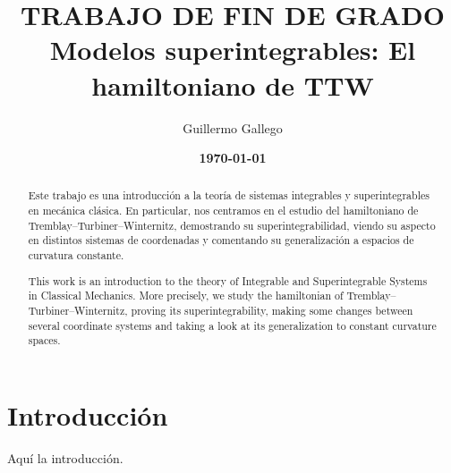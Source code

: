\documentclass[12pt,a4paper,twoside]{article}
\title{\sf TRABAJO DE FIN DE GRADO \\  Modelos superintegrables: El hamiltoniano de TTW}
\author{\sf Guillermo Gallego}
\date{\bf \today}
\theoremstyle{definition} \newtheorem{defn}[thm]{Definición}
\theoremstyle{definition} \newtheorem{ejemplo}[thm]{Ejemplo}
\theoremstyle{definition} \newtheorem{ejercicio}[thm]{Ejercicio}
\theoremstyle{remark} \newtheorem*{obs}{Observación}
\begin{document}
\maketitle
\begin{abstract}
  Este trabajo es una introducción a la teoría de sistemas integrables y superintegrables en mecánica clásica. En particular, nos centramos en el estudio del hamiltoniano de Tremblay--Turbiner--Winternitz, demostrando su superintegrabilidad, viendo su aspecto en distintos sistemas de coordenadas y comentando su generalización a espacios de curvatura constante.
\end{abstract}
\begin{abstract}
 This work is an introduction to the theory of Integrable and Superintegrable Systems in Classical Mechanics. More precisely, we study the hamiltonian of Tremblay--Turbiner--Winternitz, proving its superintegrability, making some changes between several coordinate systems and taking a look at its generalization to constant curvature spaces.
\end{abstract}
\newpage

\tableofcontents

\section*{Introducción}
Aquí la introducción.
\end{document}
